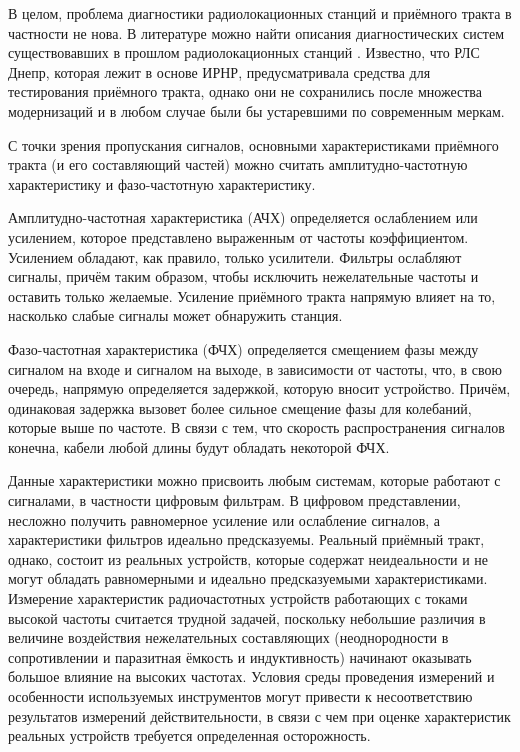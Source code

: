 \documentclass{report}
\begin{document}
В целом, проблема диагностики радиолокационных станций и приёмного тракта в частности не нова. В литературе можно найти описания диагностических систем существовавших в прошлом радиолокационных станций \cite{abm}. Известно, что РЛС Днепр, которая лежит в основе ИРНР, предусматривала средства для тестирования приёмного тракта, однако они не сохранились после множества модернизаций и в любом случае были бы устаревшими по современным меркам.

С точки зрения пропускания сигналов, основными характеристиками  приёмного тракта (и его составляющий частей) можно считать амплитудно-частотную характеристику и фазо-частотную характеристику.

Амплитудно-частотная характеристика (АЧХ) определяется ослаблением или усилением, которое представлено выраженным от частоты коэффициентом. Усилением обладают, как правило, только усилители. Фильтры ослабляют сигналы, причём таким образом, чтобы исключить нежелательные частоты и оставить только желаемые. Усиление приёмного тракта напрямую влияет на то, насколько слабые сигналы может обнаружить станция.

Фазо-частотная характеристика (ФЧХ) определяется смещением фазы между сигналом на входе и сигналом на выходе, в зависимости от частоты, что, в свою очередь, напрямую определяется задержкой, которую вносит устройство. Причём, одинаковая задержка вызовет более сильное смещение фазы для колебаний, которые выше по частоте. В связи с тем, что скорость распространения сигналов конечна, кабели любой длины будут обладать некоторой ФЧХ.

Данные характеристики можно присвоить любым системам, которые работают с сигналами, в частности цифровым фильтрам. В цифровом представлении, несложно получить равномерное усиление или ослабление сигналов, а характеристики фильтров идеально предсказуемы. Реальный приёмный тракт, однако, состоит из реальных устройств, которые содержат неидеальности и не могут обладать равномерными и идеально предсказуемыми характеристиками. Измерение характеристик радиочастотных устройств работающих с токами высокой частоты считается трудной задачей, поскольку небольшие различия в величине воздействия нежелательных составляющих (неоднородности в сопротивлении и паразитная ёмкость и индуктивность) начинают оказывать большое влияние на высоких частотах. Условия среды проведения измерений и особенности используемых инструментов могут привести к несоответствию результатов измерений действительности, в связи с чем при оценке характеристик реальных устройств требуется определенная осторожность.
\end{document}
